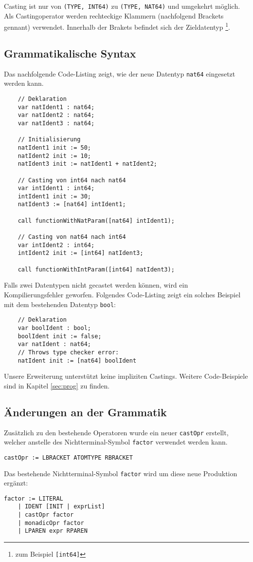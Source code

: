 \documentclass[10pt, a4paper, twocolumn]{article} %
\begin{document}
Casting ist nur von \texttt{(TYPE, INT64)} zu \texttt{(TYPE, NAT64)} und umgekehrt möglich.
Als Castingoperator werden rechteckige Klammern (nachfolgend Brackets gennant) verwendet.
Innerhalb der Brakets befindet sich der Zieldatentyp \footnote{zum Beispiel \texttt{[int64]}}.

\subsection{Grammatikalische Syntax}
Das nachfolgende Code-Listing zeigt, wie der neue Datentyp \texttt{nat64} eingesetzt werden kann.
\begin{lstlisting}
    // Deklaration
    var natIdent1 : nat64;
    var natIdent2 : nat64;
    var natIdent3 : nat64;

    // Initialisierung
    natIdent1 init := 50;
    natIdent2 init := 10;
    natIdent3 init := natIdent1 + natIdent2;

    // Casting von int64 nach nat64
    var intIdent1 : int64;
    intIdent1 init := 30;
    natIdent3 := [nat64] intIdent1;

    call functionWithNatParam([nat64] intIdent1);

    // Casting von nat64 nach int64
    var intIdent2 : int64;
    intIdent2 init := [int64] natIdent3;

    call functionWithIntParam([int64] natIdent3);
\end{lstlisting}
Falls zwei Datentypen nicht gecastet werden können, wird ein Kompilierungsfehler geworfen.
Folgendes Code-Listing zeigt ein solches Beispiel mit dem bestehenden Datentyp \texttt{bool}:
\begin{lstlisting}
    // Deklaration
    var boolIdent : bool;
    boolIdent init := false;
    var natIdent : nat64;
    // Throws type checker error:
    natIdent init := [nat64] boolIdent
\end{lstlisting}
Unsere Erweiterung unterstützt keine impliziten Castings.
Weitere Code-Beispiele sind in Kapitel \ref{sec:prog} zu finden.

\subsection{Änderungen an der Grammatik}

Zusätzlich zu den bestehende Operatoren wurde ein neuer \texttt{castOpr} erstellt, welcher anstelle des Nichtterminal-Symbol \texttt{factor} verwendet werden kann.
\begin{lstlisting}[backgroundcolor = \color{lightgray},
xleftmargin = 0.05cm,
framexleftmargin = 0.05em]
    castOpr := LBRACKET ATOMTYPE RBRACKET
\end{lstlisting}
Das bestehende Nichtterminal-Symbol \texttt{factor} wird um diese neue Produktion ergänzt:
\begin{lstlisting}[backgroundcolor = \color{lightgray},
xleftmargin = 0.05cm,
framexleftmargin = 0.05em]
    factor := LITERAL
    | IDENT [INIT | exprList]
    | castOpr factor
    | monadicOpr factor
    | LPAREN expr RPAREN
\end{lstlisting}
\end{document}
